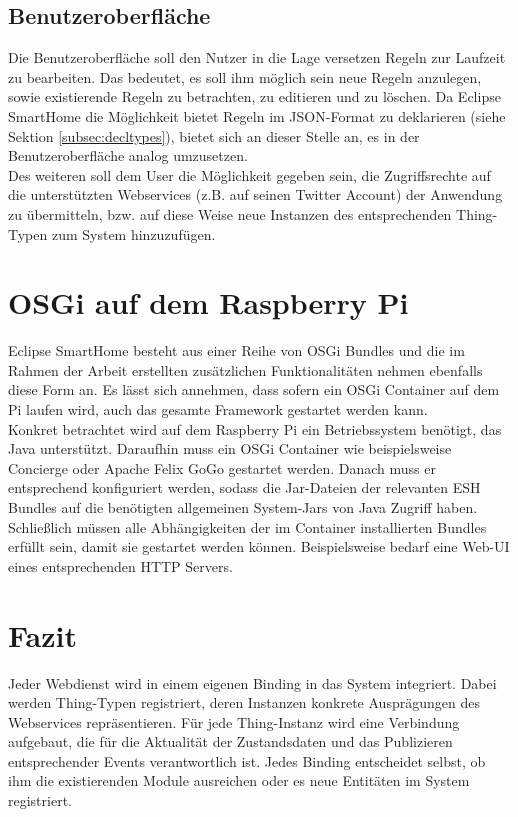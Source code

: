 \subsection{Benutzeroberfläche}
Die Benutzeroberfläche soll den Nutzer in die Lage versetzen Regeln zur Laufzeit zu bearbeiten. Das bedeutet, es soll ihm möglich sein neue Regeln anzulegen, sowie existierende Regeln zu betrachten, zu editieren und zu löschen. Da Eclipse SmartHome die Möglichkeit bietet Regeln im JSON-Format zu deklarieren (siehe Sektion \ref{subsec:decltypes}), bietet sich an dieser Stelle an, es in der Benutzeroberfläche analog umzusetzen.\\

Des weiteren soll dem User die Möglichkeit gegeben sein, die Zugriffsrechte auf die unterstützten Webservices (z.B. auf seinen Twitter Account) der Anwendung zu übermitteln, bzw. auf diese Weise neue Instanzen des entsprechenden Thing-Typen zum System hinzuzufügen.




\section{OSGi auf dem Raspberry Pi}
\label{sec:deploy}
Eclipse SmartHome besteht aus einer Reihe von OSGi Bundles und die im Rahmen der Arbeit erstellten zusätzlichen Funktionalitäten nehmen ebenfalls diese Form an. Es lässt sich annehmen, dass sofern ein OSGi Container auf dem Pi laufen wird, auch das gesamte Framework gestartet werden kann.\\

Konkret betrachtet wird auf dem Raspberry Pi ein Betriebssystem benötigt, das Java unterstützt. Daraufhin muss ein OSGi Container wie beispielsweise Concierge\cite{concierge} oder Apache Felix GoGo\cite{felixgogo} gestartet werden. Danach muss er entsprechend konfiguriert werden, sodass die Jar-Dateien der relevanten ESH Bundles auf die benötigten allgemeinen System-Jars von Java Zugriff haben. Schließlich müssen alle Abhängigkeiten der im Container installierten Bundles erfüllt sein, damit sie gestartet werden können. Beispielsweise bedarf eine Web-UI eines entsprechenden HTTP Servers.


\section{Fazit}
Jeder Webdienst wird in einem eigenen Binding in das System integriert. Dabei werden Thing-Typen registriert, deren Instanzen konkrete Ausprägungen des Webservices repräsentieren. Für jede Thing-Instanz wird eine Verbindung aufgebaut, die für die Aktualität der Zustandsdaten und das Publizieren entsprechender Events verantwortlich ist. Jedes Binding entscheidet selbst, ob ihm die existierenden Module ausreichen oder es neue Entitäten im System registriert. 






